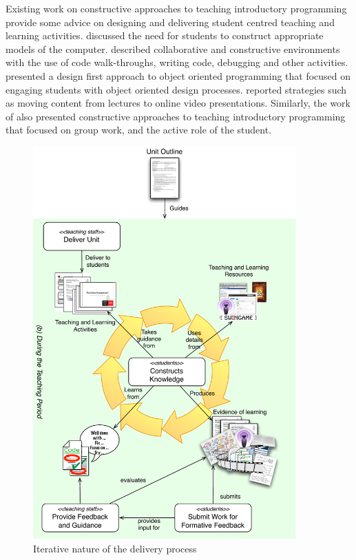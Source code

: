 Existing work on constructive approaches to teaching introductory programming provide some advice on designing and delivering student centred teaching and learning activities. \citet{BenAri:1998,BenAri:2001} discussed the need for students to construct appropriate models of the computer. \citet{VanGorp:2001} described collaborative and constructive environments with the use of code walk-throughs, writing code, debugging and other activities. \citet{Thramboulidis:2003a} presented a design first approach to object oriented programming that focused on engaging students with object oriented design processes. \citet{Wulf:2005} reported strategies such as moving content from lectures to online video presentations. Similarly, the work of \citet{Thota:2010} also presented constructive approaches to teaching introductory programming that focused on group work, and the active role of the student.

\begin{figure}[p]
	\centering
	\includegraphics[width=0.9\textwidth]{DeliverUnit}
	\caption{Iterative nature of the delivery process}
	\label{fig:deliver_unit}
\end{figure}



